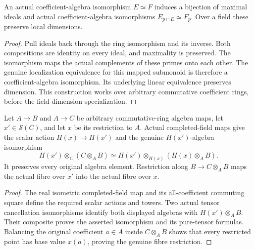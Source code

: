 \begin{lemma}
\label{algebra:maximal-localization-isomorphism}
\leanok
An actual coefficient-algebra isomorphism $E\simeq F$ induces a bijection
of maximal ideals and actual coefficient-algebra isomorphisms
$E_{p\cap E}\simeq F_p$. Over a field these preserve local dimensions.
\end{lemma}
\begin{proof}
Pull ideals back through the ring isomorphism and its inverse. Both
compositions are identity on every ideal, and maximality is preserved.
The isomorphism maps the actual complements of these primes onto each
other. The genuine localization equivalence for this mapped submonoid is
therefore a coefficient-algebra isomorphism. Its underlying linear
equivalence preserves dimension. This construction works over arbitrary
commutative coefficient rings, before the field dimension specialization.
\end{proof}

\begin{definition}
\label{spectrum:completed-fibre-base-change-tensor}
\leanok
{}
Let $A\to B$ and $A\to C$ be arbitrary commutative-ring algebra maps,
let $x'\in\mathcal S(C)$, and let $x$ be its restriction to $A$. Actual
completed-field maps give the scalar action $H(x)\to H(x')$ and the genuine
$H(x')$-algebra isomorphism
\[
 H(x')\otimes_C(C\otimes_AB)
 \simeq H(x')\otimes_{H(x)}(H(x)\otimes_AB).
\]
It preserves every original algebra element. Restriction along $B\to
C\otimes_AB$ maps the actual fibre over $x'$ into the actual fibre over $x$.
\end{definition}
\begin{proof}
The real isometric completed-field map and its all-coefficient commuting
square define the required scalar actions and towers. Two actual tensor
cancellation isomorphisms identify both displayed algebras with
$H(x')\otimes_AB$. Their composite proves the asserted isomorphism and
its pure-tensor formulas. Balancing the original coefficient $a\in A$
inside $C\otimes_AB$ shows that every restricted point has base value
$x(a)$, proving the genuine fibre restriction.
\end{proof}

